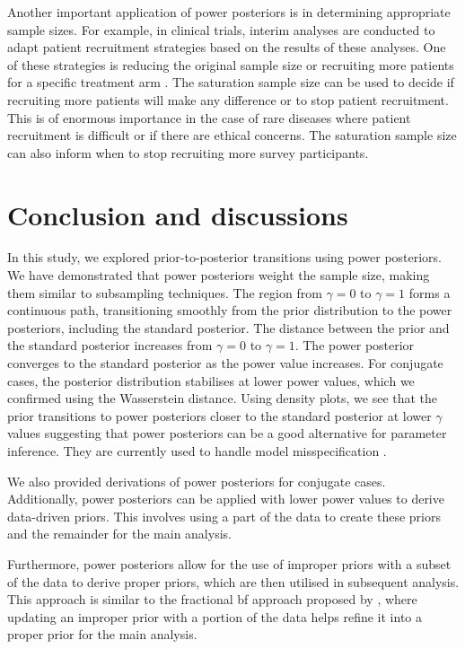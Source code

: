 \documentclass[12pt]{article}
\begin{document}
Another important application of power posteriors is in determining appropriate sample sizes. For example, in clinical trials, interim analyses are conducted to adapt patient recruitment strategies based on the results of these analyses. One of these strategies is reducing the original sample size or recruiting more patients for a specific treatment arm \citep{Berry2006, Ryan2022}. The saturation sample size can be used to decide if recruiting more patients will make any difference or to stop patient recruitment. This is of enormous importance in the case of rare diseases where patient recruitment is difficult or if there are ethical concerns. The saturation sample size can also inform when to stop recruiting more survey participants.




\FloatBarrier
\section{Conclusion and discussions}
In this study, we explored prior-to-posterior transitions using power posteriors. We have demonstrated that power posteriors weight the sample size, making them similar to subsampling techniques.  The region from $\gamma =0$ to $\gamma =1$ forms a continuous path, transitioning smoothly from the prior distribution to the power posteriors, including the standard posterior. The distance between the prior and the standard posterior increases from $\gamma =0$ to $\gamma =1$. 
The power posterior converges to the standard posterior as the power value increases. For conjugate cases, the posterior distribution stabilises at lower power values, which we confirmed using the Wasserstein distance. Using density plots, we see that the prior transitions to power posteriors closer to the standard posterior at lower $\gamma$ values suggesting that power posteriors can be a good alternative for parameter inference. They are currently used to handle model misspecification \citep{Jeffrey_2019}.

We also provided derivations of power posteriors for conjugate cases.  Additionally, power posteriors can be applied with lower power values to derive data-driven priors. This involves using a part of the data to create these priors and the remainder for the main analysis.

Furthermore, power posteriors allow for the use of improper priors with a subset of the data to derive proper priors, which are then utilised in subsequent analysis. This approach is similar to the fractional \gls{bf} approach proposed by \cite{ohaganPropertiesIntrinsicFractional1997}, where updating an improper prior with a portion of the data helps refine it into a proper prior for the main analysis.
\end{document}
